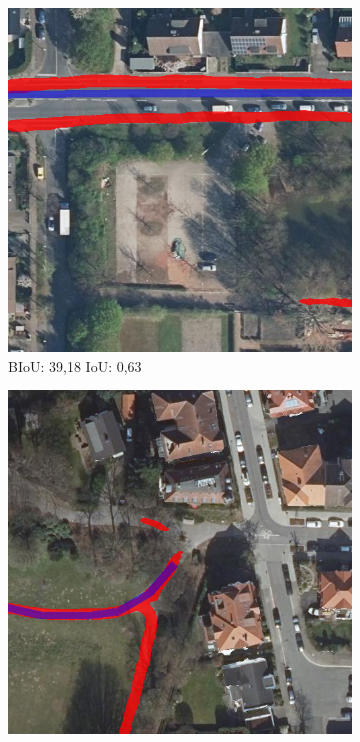 \begin{figure}
	\centering
	\begin{subfigure}{.32\textwidth}
		\centering
		\includegraphics[width=1.\linewidth]{Bilder/biou/badish-q3918-iou0063-idx498.png}
		\caption{\ac{BIoU}: 39,18 \ac{IoU}: 0,63}
	\end{subfigure}
	\begin{subfigure}{.32\textwidth}
		\centering
		\includegraphics[width=1.\linewidth]{Bilder/biou/medium-q5804-iou3622-idx907.png}

\end{subfigure}
\end{figure}
